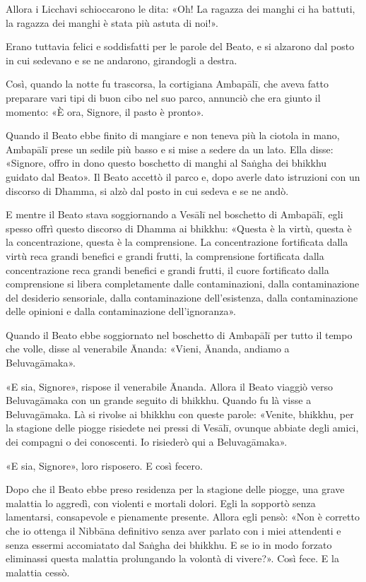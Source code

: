 Allora i Licchavi schioccarono le dita: «Oh! La ragazza dei manghi ci
ha battuti, la ragazza dei manghi è stata più astuta di noi!».


Erano tuttavia felici e soddisfatti per le parole del Beato, e si
alzarono dal posto in cui sedevano e se ne andarono, girandogli a
destra.


Così, quando la notte fu trascorsa, la cortigiana Ambapālī, che aveva
fatto preparare vari tipi di buon cibo nel suo parco, annunciò che era
giunto il momento: «È ora, Signore, il pasto è pronto».


Quando il Beato ebbe finito di mangiare e non teneva più la ciotola in
mano, Ambapālī prese un sedile più basso e si mise a sedere da un lato.
Ella disse: «Signore, offro in dono questo boschetto di manghi al Saṅgha
dei bhikkhu guidato dal Beato». Il Beato accettò il parco e, dopo averle
dato istruzioni con un discorso di Dhamma, si alzò dal posto in cui
sedeva e se ne andò.


E mentre il Beato stava soggiornando a Vesālī nel boschetto di Ambapālī,
egli spesso offrì questo discorso di Dhamma ai bhikkhu: «Questa è la
virtù, questa è la concentrazione, questa è la comprensione. La
concentrazione fortificata dalla virtù reca grandi benefici e grandi
frutti, la comprensione fortificata dalla concentrazione reca grandi
benefici e grandi frutti, il cuore fortificato dalla comprensione si
libera completamente dalle contaminazioni, dalla contaminazione del
desiderio sensoriale, dalla contaminazione dell’esistenza, dalla
contaminazione delle opinioni e dalla contaminazione dell’ignoranza».




Quando il Beato ebbe soggiornato nel boschetto di Ambapālī per tutto il
tempo che volle, disse al venerabile Ānanda: «Vieni, Ānanda, andiamo a
Beluvagāmaka».


«E sia, Signore», rispose il venerabile Ānanda. Allora il Beato viaggiò
verso Beluvagāmaka con un grande seguito di bhikkhu. Quando fu là visse
a Beluvagāmaka. Là si rivolse ai bhikkhu con queste parole: «Venite,
bhikkhu, per la stagione delle piogge risiedete nei pressi di Vesālī,
ovunque abbiate degli amici, dei compagni o dei conoscenti. Io risiederò
qui a Beluvagāmaka».


«E sia, Signore», loro risposero. E così fecero.


Dopo che il Beato ebbe preso residenza per la stagione delle piogge, una
grave malattia lo aggredì, con violenti e mortali dolori. Egli la
sopportò senza lamentarsi, consapevole e pienamente presente. Allora
egli pensò: «Non è corretto che io ottenga il Nibbāna definitivo senza
aver parlato con i miei attendenti e senza essermi accomiatato dal
Saṅgha dei bhikkhu. E se io in modo forzato eliminassi questa malattia
prolungando la volontà di vivere?». Così fece. E la malattia cessò.


